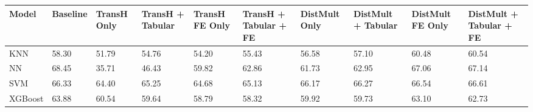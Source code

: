\begin{tabular}{llllllllll}
\toprule
Model & Baseline & TransH Only & TransH + Tabular & TransH FE Only & TransH + Tabular + FE & DistMult Only & DistMult + Tabular & DistMult FE Only & DistMult + Tabular + FE \\
\midrule
KNN & 58.30 & 51.79 & 54.76 & 54.20 & 55.43 & 56.58 & 57.10 & 60.48 & 60.54 \\
NN & 68.45 & 35.71 & 46.43 & 59.82 & 62.86 & 61.73 & 62.95 & 67.06 & 67.14 \\
SVM & 66.33 & 64.40 & 65.25 & 64.68 & 65.13 & 66.17 & 66.27 & 66.54 & 66.61 \\
XGBoost & 63.88 & 60.54 & 59.64 & 58.79 & 58.32 & 59.92 & 59.73 & 63.10 & 62.73 \\
\bottomrule
\end{tabular}
